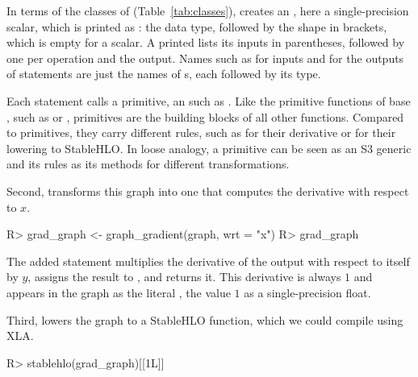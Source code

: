 \documentclass[article,shortnames]{jss}
\renewenvironment{CodeChunk}{\par\addvspace{0.6\baselineskip}\noindent\begin{minipage}{\linewidth}}{\end{minipage}\par\vspace{0.6\baselineskip}}
\begin{document}
In terms of the classes of  (Table~\ref{tab:classes}),  creates an , here a single-precision scalar, which is printed as : the data type, followed by the shape in brackets, which is empty for a scalar.
A printed  lists its inputs in parentheses, followed by one  per operation and the output.
Names such as  for inputs and  for the outputs of statements are just the names of s, each followed by its type.

Each statement calls a primitive, an  such as .
Like the primitive functions of base , such as \code{+} or , primitives are the building blocks of all other functions.
Compared to   primitives, they carry different rules, such as  for their derivative or  for their lowering to StableHLO.
In loose analogy, a primitive can be seen as an S3 generic and its rules as its methods for different transformations.

Second,  transforms this graph into one that computes the derivative with respect to $x$.

\begin{CodeChunk}
\begin{CodeInput}
R> grad_graph <- graph_gradient(graph, wrt = "x")
R> grad_graph
\end{CodeInput}
\end{CodeChunk}

The added statement multiplies the derivative of the output with respect to itself by $y$, assigns the result to , and returns it.
This derivative is always $1$ and appears in the graph as the literal , the value $1$ as a single-precision float.

Third,  lowers the graph to a StableHLO function, which we could compile using XLA.

\begin{CodeChunk}
\begin{CodeInput}
R> stablehlo(grad_graph)[[1L]]
\end{CodeInput}
\end{CodeChunk}
\end{document}

